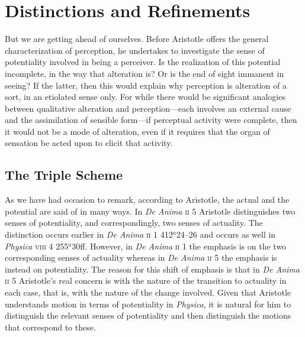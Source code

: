 
\section{Distinctions and Refinements} %
\label{sec:distinctions_and_refinements}

But we are getting ahead of ourselves. Before Aristotle offers the general characterization of perception, he undertakes to investigate the sense of potentiality involved in being a perceiver. Is the realization of this potential incomplete, in the way that alteration is? Or is the end of sight immanent in seeing? If the latter, then this would explain why perception is alteration of a sort, in an etiolated sense only. For while there would be significant analogies between qualitative alteration and perception---each involves an external cause and the assimilation of sensible form---if perceptual activity were complete, then it would not be a mode of alteration, even if it requires that the organ of sensation be acted upon to elicit that activity.


\subsection{The Triple Scheme} %
\label{sub:the_triple_scheme}

As we have had occasion to remark, according to Aristotle, the actual and the potential are said of in many ways. In \emph{De Anima} \textsc{ii} 5 Aristotle distinguishes two senses of potentiality, and correspondingly, two senses of actuality. The distinction occurs earlier in \emph{De Anima} \textsc{ii} 1 412\( ^{a} \)24--26 and occurs as well in \emph{Physica} \textsc{viii} 4 255\( ^{a} \)30ff. However, in \emph{De Anima} \textsc{ii} 1 the emphasis is on the two corresponding senses of actuality whereas in \emph{De Anima} \textsc{ii} 5 the emphasis is instead on potentiality. The reason for this shift of emphasis is that in \emph{De Anima} \textsc{ii} 5 Aristotle's real concern is with the nature of the transition to actuality in each case, that is, with the nature of the change involved. Given that Aristotle understands motion in terms of potentiality in \emph{Physica}, it is natural for him to distinguish the relevant senses of potentiality and then distinguish the motions that correspond to these.

